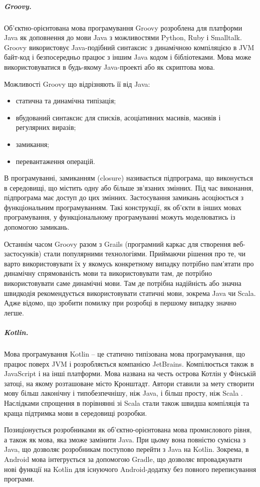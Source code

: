 \documentclass[../main.tex]{subfiles}
\begin{document}
\subparagraph{Groovy.}
Об'єктно-орієнтована мова програмування Groovy розроблена для платформи Java як доповнення до мови Java з можливостями Python, Ruby і Smalltalk. Groovy використовує Java-подібний синтаксис з динамічною компіляцією в JVM байт-код і безпосередньо працює з іншим Java кодом і бібліотеками. Мова може використовуватися в будь-якому Java-проекті або як скриптова мова. 

Можливості Groovy що відрізняють її від Java:
\begin{itemize}[label={--}]
	\item статична та динамічна типізація;
	\item вбудований синтаксис для списків, асоціативних масивів, масивів і регулярних виразів;
	\item замикання;
	\item перевантаження операцій.
\end{itemize}

В програмуванні, замиканням (closure) називається підпрограма, що виконується в середовищі, що містить одну або більше зв'язаних змінних. Під час виконання, підпрограма має доступ до цих змінних. Застосування замикань асоціюється з функціональним програмуванням. Такі конструкції, як об'єкти в інших мовах програмування, у функціональному програмуванні можуть моделюватись із допомогою замикань.

Останнім часом Groovy разом з Grails (програмний каркас для створення веб-застосунків) стали популярними технологіями. Приймаючи рішення про те, чи варто використовувати їх у якомусь конкретному випадку потрібно пам’ятати про динамічну спрямованість мови та використовувати там, де потрібно використовувати саме динамічні мови. Там де потрібна надійність або значна швидкодія рекомендується використовувати статичні мови, зокрема Java чи Scala. Адже відомо, що зробити помилку при розробці в першому випадку значно легше.

\subparagraph{Kotlin.}
Мова програмування Kotlin -- це статично типізована мова програмування, що працює поверх JVM і розробляється компанією JetBrains. Компілюється також в JavaScript і на інші платформи. Мова названа на честь острова Котлін у Фінській затоці, на якому розташоване місто Кронштадт. Автори ставили за мету створити мову більш лаконічну і типобезпечнішу, ніж Java, і більш просту, ніж Scala \cite{open_systems}. Наслідками спрощення в порівнянні зі Scala стали також швидша компіляція та краща підтримка мови в середовищі розробки.

Позиціонується розробниками як об'єктно-орієнтована мова промислового рівня, а також як мова, яка зможе замінити Java. При цьому вона повністю сумісна з Java, що дозволяє розробникам поступово перейти з Java на Kotlin. Зокрема, в Android мова інтегрується за допомогою Gradle, що дозволяє впроваджувати нові функції на Kotlin для існуючого Android-додатку без повного переписування програми.
\end{document}
